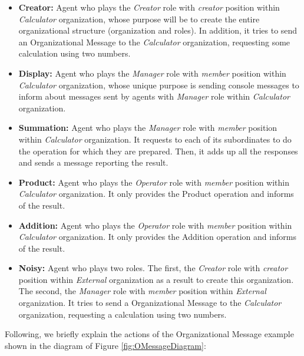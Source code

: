 \begin{itemize}
\item \textbf{Creator:} Agent who plays the \textit{Creator} role with \textit{creator} position within
  \textit{Calculator} organization, whose purpose will be to create the entire organizational structure
  (organization and roles). In addition, it tries to send an Organizational Message to the \textit{Calculator}
  organization, requesting some calculation using two numbers.
\item \textbf{Display:} Agent who plays the \textit{Manager} role with \textit{member} position within
  \textit{Calculator} organization, whose unique purpose is sending console messages to inform about messages
  sent by agents with \textit{Manager} role within \textit{Calculator} organization.
\item \textbf{Summation:} Agent who plays the \textit{Manager} role with \textit{member} position within
  \textit{Calculator} organization. It requests to each of its subordinates to do the operation for which
  they are prepared. Then, it adds up all the responses and sends a message reporting the result.
\item \textbf{Product:} Agent who plays the \textit{Operator} role with \textit{member} position within
  \textit{Calculator} organization. It only provides the Product operation and informs of the result.
\item \textbf{Addition:} Agent who plays the \textit{Operator} role with \textit{member} position within
  \textit{Calculator} organization. It only provides the Addition operation and informs of the result.
\item \textbf{Noisy:} Agent who plays two roles. The first, the \textit{Creator} role with \textit{creator}
  position within \textit{External} organization as a result to create this organization. The second, the
  \textit{Manager} role with \textit{member} position within \textit{External} organization. It tries to send
  a Organizational Message to the \textit{Calculator} organization, requesting a calculation using two
  numbers.
\end{itemize}

Following, we briefly explain the actions of the Organizational Message example shown in the diagram of Figure
\ref{fig:OMessageDiagram}:

